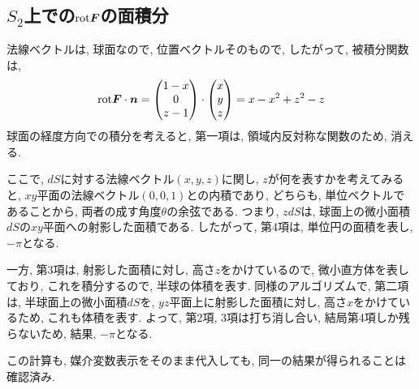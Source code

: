 \documentclass{jsarticle} \usepackage[dvipdfmx]{graphicx} \usepackage[dvipdfmx]{hyperref}
\newcommand*{\mbold}[1]{\mbox{\boldmath $#1$}}
\newcommand*{\rot}{{\rm rot}}
\begin{document}
\subsection*{$S_2$上での$\rot\mbold{F}$の面積分}
法線ベクトルは, 球面なので, 位置ベクトルそのもので, したがって, 被積分関数は, 
\begin{equation}
  \rot\mbold{F} \cdot \mbold{n} = 
  \begin{pmatrix}
    1 - x \\
    0 \\
    z - 1 \\
  \end{pmatrix}
  \cdot
  \begin{pmatrix}
    x \\
    y \\
    z \\
  \end{pmatrix}
  = x - x^2 + z^2 - z
\end{equation}
球面の経度方向での積分を考えると, 第一項は, 領域内反対称な関数のため, 消える. 

ここで, $dS$に対する法線ベクトル$(x, y, z)$に関し, $z$が何を表すかを考えてみると, 
$xy$平面の法線ベクトル$(0, 0, 1)$との内積であり, どちらも, 単位ベクトルであることから, 両者の成す角度$\theta$の余弦である. 
つまり, $z dS$は, 球面上の微小面積$dS$の$xy$平面への射影した面積である. 
したがって, 第4項は, 単位円の面積を表し, $-\pi$となる. 

一方, 第3項は, 射影した面積に対し, 高さ$z$をかけているので, 微小直方体を表しており, これを積分するので, 半球の体積を表す. 
同様のアルゴリズムで, 第二項は, 半球面上の微小面積$dS$を, $yz$平面上に射影した面積に対し, 高さ$x$をかけているため, これも体積を表す. 
よって, 第2項, 3項は打ち消し合い, 結局第4項しか残らないため, 
結果, $-\pi$となる. 

この計算も, 媒介変数表示をそのまま代入しても, 同一の結果が得られることは確認済み. 
\end{document}
